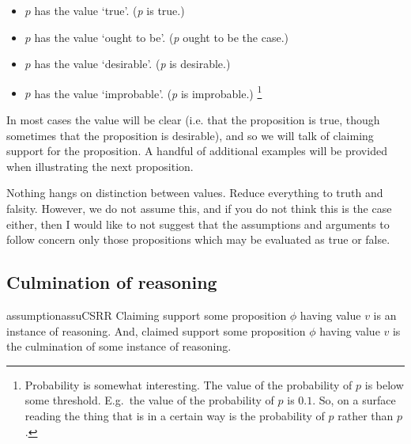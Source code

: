 \begin{note}
    \begin{itemize}
  \item \(p\) has the value `true'. \hfill (\emph{p} is true.)
  \item \(p\) has the value `ought to be'. \hfill (\emph{p} ought to be the case.)
  \item \(p\) has the value `desirable'. \hfill (\emph{p} is desirable.)
  \item \(p\) has the value `improbable'. \hfill (\emph{p} is improbable.)\nolinebreak
    \footnote{
      Probability is somewhat interesting.
      The value of the probability of \(p\) is below some threshold.
      E.g.\ the value of the probability of \(p\) is \(0.1\).
      So, on a surface reading the thing that is in a certain way is the probability of \(p\) rather than \(p\).
    }
  \end{itemize}
\end{note}

\begin{note}
In most cases the value will be clear (i.e. that the proposition is true, though sometimes that the proposition is desirable), and so we will talk of claiming support for the proposition.
  A handful of additional examples will be provided when illustrating the next proposition.
\end{note}

\begin{note}
  Nothing hangs on distinction between values.
  Reduce everything to truth and falsity.
  However, we do not assume this, and if you do not think this is the case either, then I would like to not suggest that the assumptions and arguments to follow concern only those propositions which may be evaluated as true or false.
\end{note}

\subsection{Culmination of reasoning}

\begin{note}
  \begin{restatable}{assumption}{assuCSRR}\label{assu:CS-culmination-of-R}
    Claiming support some proposition \(\phi\) having value \(v\) is an instance of reasoning.
    And, claimed support some proposition \(\phi\) having value \(v\) is the culmination of some instance of reasoning.
  \end{restatable}
\end{note}

